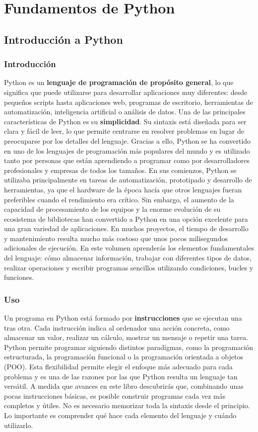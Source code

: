 \documentclass[11pt,a5paper,twoside]{book}
\begin{document}
\setcounter{tocdepth}{1}
\tableofcontents
\chapter{Fundamentos de Python}

\section{Introducción a Python}
\subsection{Introducción}
Python es un \textbf{lenguaje de programación de propósito general}, lo que significa que puede utilizarse para desarrollar aplicaciones muy diferentes: desde pequeños scripts hasta aplicaciones web, programas de escritorio, herramientas de automatización, inteligencia artificial o análisis de datos.
Una de las principales características de Python es su \textbf{simplicidad}. Su sintaxis está diseñada para ser clara y fácil de leer, lo que permite centrarse en resolver problemas en lugar de preocuparse por los detalles del lenguaje.
Gracias a ello, Python se ha convertido en uno de los lenguajes de programación más populares del mundo y es utilizado tanto por personas que están aprendiendo a programar como por desarrolladores profesionales y empresas de todos los tamaños.
En sus comienzos, Python se utilizaba principalmente en tareas de automatización, prototipado y desarrollo de herramientas, ya que el hardware de la época hacía que otros lenguajes fueran preferibles cuando el rendimiento era crítico. Sin embargo, el aumento de la capacidad de procesamiento de los equipos y la enorme evolución de su ecosistema de bibliotecas han convertido a Python en una opción excelente para una gran variedad de aplicaciones. En muchos proyectos, el tiempo de desarrollo y mantenimiento resulta mucho más costoso que unos pocos milisegundos adicionales de ejecución.
En este volumen aprenderás los elementos fundamentales del lenguaje: cómo almacenar información, trabajar con diferentes tipos de datos, realizar operaciones y escribir programas sencillos utilizando condiciones, bucles y funciones.
\subsection{Uso}
Un programa en Python está formado por \textbf{instrucciones} que se ejecutan una tras otra. Cada instrucción indica al ordenador una acción concreta, como almacenar un valor, realizar un cálculo, mostrar un mensaje o repetir una tarea.
Python permite programar siguiendo distintos paradigmas, como la programación estructurada, la programación funcional o la programación orientada a objetos (POO). Esta flexibilidad permite elegir el enfoque más adecuado para cada problema y es una de las razones por las que Python resulta un lenguaje tan versátil.
A medida que avances en este libro descubrirás que, combinando unas pocas instrucciones básicas, es posible construir programas cada vez más completos y útiles.
No es necesario memorizar toda la sintaxis desde el principio. Lo importante es comprender qué hace cada elemento del lenguaje y cuándo utilizarlo.
\end{document}
